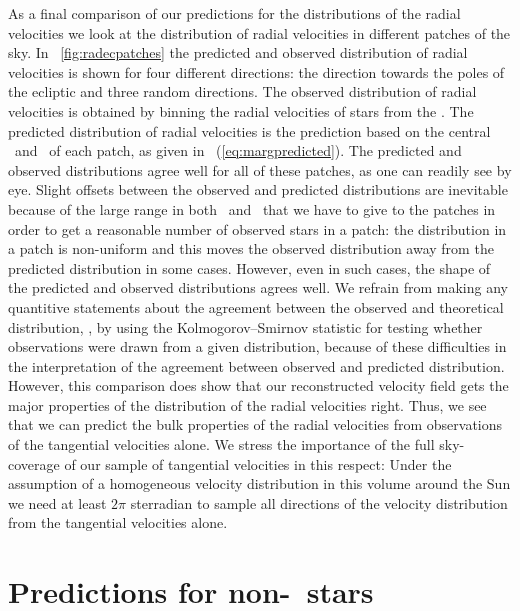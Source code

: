 As a final comparison of our predictions for the distributions of the
radial velocities we look at the distribution of radial velocities in
different patches of the sky. In \figurename~\ref{fig:radecpatches}
the predicted and observed distribution of radial velocities is shown
for four different directions: the direction towards the poles of the
ecliptic and three random directions. The observed distribution of
radial velocities is obtained by binning the radial velocities of
stars from the \gcsabb. The predicted distribution of radial
velocities is the prediction based on the central \ra\ and \dec\ of
each patch, as given in \eqnnumber~(\ref{eq:margpredicted}). The
predicted and observed distributions agree well for all of these
patches, as one can readily see by eye. Slight offsets between the
observed and predicted distributions are inevitable because of the
large range in both \ra\ and \dec\ that we have to give to the patches
in order to get a reasonable number of observed stars in a patch: the
distribution in a patch is non-uniform and this moves the observed
distribution away from the predicted distribution in some
cases. However, even in such cases, the shape of the predicted and
observed distributions agrees well. We refrain from making any
quantitive statements about the agreement between the observed and
theoretical distribution, \eg, by using the Kolmogorov--Smirnov
statistic for testing whether observations were drawn from a given
distribution, because of these difficulties in the interpretation of
the agreement between observed and predicted distribution. However,
this comparison does show that our reconstructed velocity field gets
the major properties of the distribution of the radial velocities
right. Thus, we see that we can predict the bulk properties of the
radial velocities from observations of the tangential velocities
alone. We stress the importance of the full sky-coverage of our sample
of tangential velocities in this respect: Under the assumption of a
homogeneous velocity distribution in this volume around the Sun we
need at least $2\pi$ sterradian to sample all directions of the
velocity distribution from the tangential velocities alone.


\section{Predictions for non-\gcsabb\ stars}

